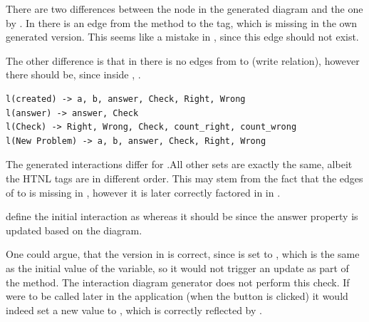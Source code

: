 There are two differences between the  node in the generated diagram and the one by \parencite{zhang2019scenario}.
In \textcite{zhang2019scenario} there is an edge from
the  method to the  tag, which is missing in the own generated version. This seems like a mistake in \parencite{zhang2019scenario}, since this edge should not exist.

The other difference is that in \parencite{zhang2019scenario} there is no edges from  to  (write relation), however there should be, since
inside , .

\begin{lstlisting}[language=JavaScriptPlain]
l(created) -> a, b, answer, Check, Right, Wrong
l(answer) -> answer, Check
l(Check) -> Right, Wrong, Check, count_right, count_wrong
l(New Problem) -> a, b, answer, Check, Right, Wrong
\end{lstlisting}

The generated interactions differ for .All other sets are exactly the same, albeit the HTNL tags are in different order. This may stem from the fact that the edges of  to  is missing in \parencite{zhang2019scenario}, however it is later correctly factored in in .

\textcite{zhang2019scenario} define the initial interaction as  
whereas it should be 
 since the answer property is updated based on the diagram. 

One could argue, that the version in \parencite{zhang2019scenario} is correct, since  is set to , which is the same as the initial value of the variable, so it would not trigger an update as part of the  method. The interaction diagram generator does not perform this check. If  were to be called later in the application (when the  button is clicked) it would indeed set a new value to , which is correctly reflected by \textcite{zhang2019scenario}.


